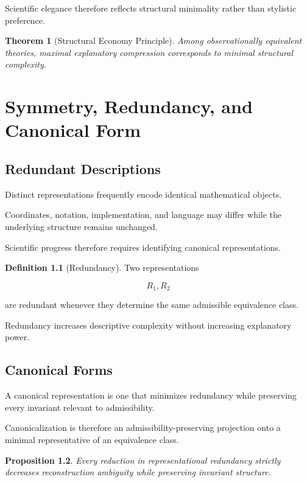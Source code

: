 \documentclass[11pt,oneside]{book}
\numberwithin{equation}{chapter}
\theoremstyle{definition}
\newtheorem{definition}{Definition}[chapter]
\theoremstyle{plain}
\newtheorem{theorem}[definition]{Theorem}
\newtheorem{proposition}[definition]{Proposition}
\begin{document}
Scientific elegance therefore reflects structural minimality rather than
stylistic preference.

\begin{theorem}[Structural Economy Principle]

Among observationally equivalent theories, maximal explanatory compression
corresponds to minimal structural complexity.

\end{theorem}

\chapter{Symmetry, Redundancy, and Canonical Form}

\section{Redundant Descriptions}

Distinct representations frequently encode identical mathematical objects.

Coordinates, notation, implementation, and language may differ while the
underlying structure remains unchanged.

Scientific progress therefore requires identifying canonical
representations.

\begin{definition}[Redundancy]

Two representations

\[
R_1,
R_2
\]

are redundant whenever they determine the same admissible equivalence class.

\end{definition}

Redundancy increases descriptive complexity without increasing explanatory
power.

\section{Canonical Forms}

A canonical representation is one that minimizes redundancy while preserving
every invariant relevant to admissibility.

Canonicalization is therefore an admissibility-preserving projection onto a
minimal representative of an equivalence class.

\begin{proposition}

Every reduction in representational redundancy strictly decreases
reconstruction ambiguity while preserving invariant structure.

\end{proposition}
\end{document}
